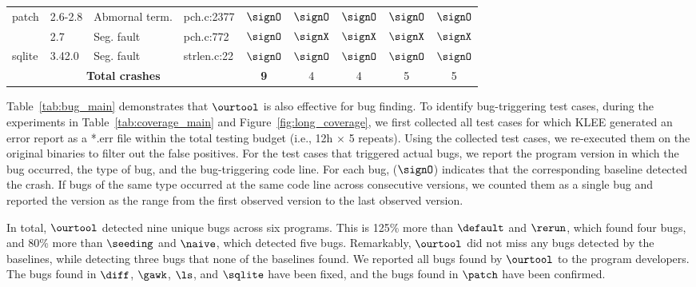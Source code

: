 \begin{table}[]
{\begin{tabular}{llllccccc}
    \multirow{2}{*}{patch}                                                        & 2.6-2.8                              & Abmornal term.                          & pch.c:2377                           & $\signO$              & $\signO$             & $\signO$              & $\signO$             & $\signO$       \\
                & 2.7                              & Seg. fault                              & pch.c:772                            & $\signO$              & $\signX$             & $\signX$              & $\signX$             & $\signX$              \\ \midrule
    sqlite                               & 3.42.0                               & Seg. fault                              & strlen.c:22                       & $\signO$              & $\signO$             & $\signO$              & $\signO$             & $\signO$              \\ \midrule \midrule
    \multicolumn{4}{c}{\textbf{Total crashes}}                                                                                                                        & \textbf{9}     & 4             & 4              & 5             & 5              \\ \midrule \bottomrule
    \end{tabular}%
    }
\end{table}

Table~\ref{tab:bug_main} demonstrates that $\ourtool$ is also effective for bug finding. To identify bug-triggering test cases, during the experiments in Table~\ref{tab:coverage_main} and Figure~\ref{fig:long_coverage}, we first collected all test cases for which KLEE generated an error report as a *.err file within the total testing budget (i.e., 12h $\times$ 5 repeats). Using the collected test cases, we re-executed them on the original binaries to filter out the false positives. For the test cases that triggered actual bugs, we report the program version in which the bug occurred, the type of bug, and the bug-triggering code line. For each bug, ($\signO$) indicates that the corresponding baseline detected the crash. If bugs of the same type occurred at the same code line across consecutive versions, we counted them as a single bug and reported the version as the range from the first observed version to the last observed version.

In total, $\ourtool$ detected nine unique bugs across six programs. This is 125\% more than $\default$ and $\rerun$, which found four bugs, and 80\% more than $\seeding$ and $\naive$, which detected five bugs. Remarkably, $\ourtool$ did not miss any bugs detected by the baselines, while detecting three bugs that none of the baselines found. We reported all bugs found by $\ourtool$ to the program developers. The bugs found in $\diff$, $\gawk$, $\ls$, and $\sqlite$ have been fixed, and the bugs found in $\patch$ have been confirmed.